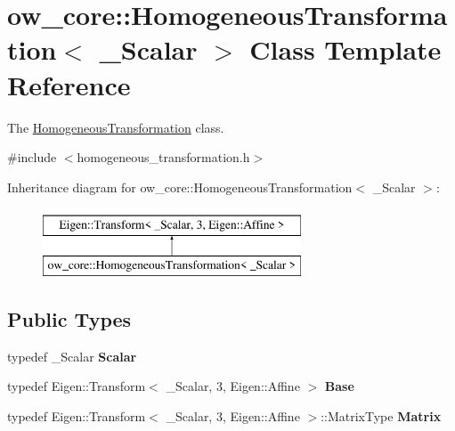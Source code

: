 \hypertarget{classow__core_1_1HomogeneousTransformation}{}\section{ow\+\_\+core\+:\+:Homogeneous\+Transformation$<$ \+\_\+\+Scalar $>$ Class Template Reference}
\label{classow__core_1_1HomogeneousTransformation}


The \hyperlink{classow__core_1_1HomogeneousTransformation}{Homogeneous\+Transformation} class.  




{\ttfamily \#include $<$homogeneous\+\_\+transformation.\+h$>$}

Inheritance diagram for ow\+\_\+core\+:\+:Homogeneous\+Transformation$<$ \+\_\+\+Scalar $>$\+:\begin{figure}[H]
\begin{center}
\leavevmode
\includegraphics[height=2.000000cm]{d5/de4/classow__core_1_1HomogeneousTransformation}
\end{center}
\end{figure}
\subsection*{Public Types}
\begin{DoxyCompactItemize}
\item 
typedef \+\_\+\+Scalar {\bfseries Scalar}\hypertarget{classow__core_1_1HomogeneousTransformation_a831cf394e7c5ef71aa2384c942d353cc}{}\label{classow__core_1_1HomogeneousTransformation_a831cf394e7c5ef71aa2384c942d353cc}

\item 
typedef Eigen\+::\+Transform$<$ \+\_\+\+Scalar, 3, Eigen\+::\+Affine $>$ {\bfseries Base}\hypertarget{classow__core_1_1HomogeneousTransformation_a139a040b2aaf4205cd2ee48efcda3a5a}{}\label{classow__core_1_1HomogeneousTransformation_a139a040b2aaf4205cd2ee48efcda3a5a}

\item 
typedef Eigen\+::\+Transform$<$ \+\_\+\+Scalar, 3, Eigen\+::\+Affine $>$\+::Matrix\+Type {\bfseries Matrix}\hypertarget{classow__core_1_1HomogeneousTransformation_a1ce471e38a5056c8e97409a1c3bd9798}{}\label{classow__core_1_1HomogeneousTransformation_a1ce471e38a5056c8e97409a1c3bd9798}

\end{DoxyCompactItemize}
